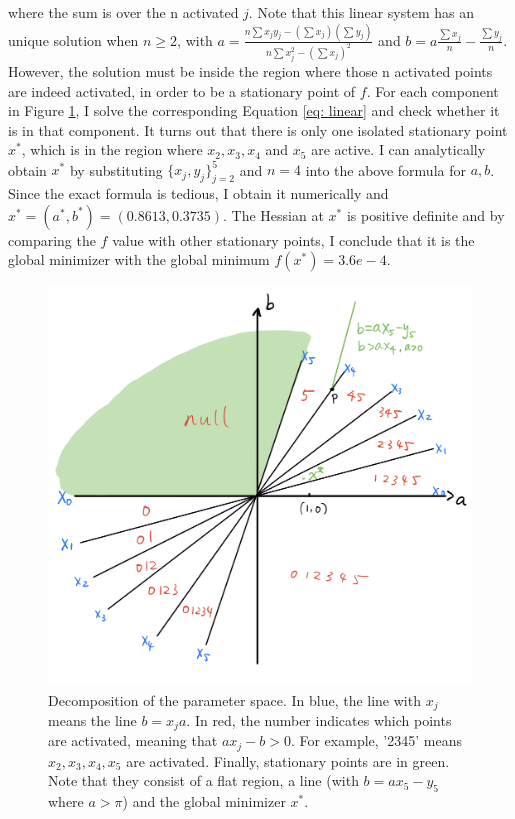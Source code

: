\documentclass{article}
\begin{document}
\begin{itemize}
	where the sum is over the n activated $ j $. Note that this linear system has an unique solution when $ n \geq 2 $, with $ a = \frac{n\sum x_j y_j - (\sum x_j)(\sum y_j)}{n\sum x_j^2 - (\sum x_j)^2} $ and $ b = a \frac{\sum x_j}{n} - \frac{\sum y_j}{n} $. However, the solution must be inside the region where those n activated points are indeed activated, in order to be a stationary point of $ f $. For each component in Figure \ref{fig: space decomposition}, I solve the corresponding Equation \ref{eq: linear} and check whether it is in that component. It turns out that there is only one isolated stationary point $ x^{\ast} $, which is in the region where $ x_2, x_3, x_4 $ and $ x_5 $ are active. I can analytically obtain $ x^{*} $ by substituting $ \{x_j, y_j\}_{j=2}^{5} $  and $ n=4 $ into the above formula for $ a,b $. Since the exact formula is tedious, I obtain it numerically and $ x^{*} = (a^{*}, b^{*}) = (0.8613, 0.3735) $. The Hessian at $ x^{*} $ is positive definite and by comparing the $ f $ value with other stationary points, I conclude that it is the global minimizer with the global minimum $ f(x^{*}) = 3.6e-4 $. 
\end{itemize}

\begin{figure}[htp]
	\centering
	\includegraphics[width=.7\linewidth]{figs/SpaceDecompostion}
	\caption{Decomposition of the parameter space. In blue, the line with $ x_j $ means the line $ b = x_j a $. In red, the number indicates which points are activated, meaning that $ ax_j - b > 0 $. For example, '2345' means $ x_2,x_3,x_4,x_5 $ are activated. Finally, stationary points are in green. Note that they consist of a flat region, a line (with $ b=ax_5-y_5 $ where $ a>\pi $) and the global minimizer $ x^{*} $.}
	\label{fig: space decomposition}
\end{figure}
\end{document}
